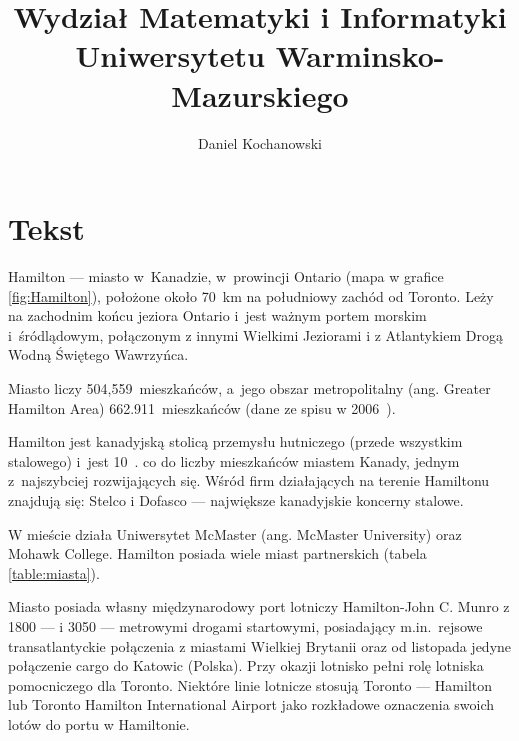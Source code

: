 \documentclass[a4paper,12pt]{article}
\title{Wydział Matematyki i Informatyki Uniwersytetu Warminsko-Mazurskiego}
\author{Daniel Kochanowski}
\begin{document}
\maketitle

\begin{abstract}
\end{abstract}

\section{Tekst}

\indent Hamilton --- miasto w~Kanadzie, w~prowincji Ontario (mapa w grafice \ref{fig:Hamilton}), położone około 70~km na południowy zachód od Toronto. Leży na zachodnim końcu jeziora Ontario i~jest ważnym portem morskim i~śródlądowym, połączonym z innymi Wielkimi Jeziorami i z Atlantykiem Drogą Wodną Świętego Wawrzyńca.

Miasto liczy 504,559~mieszkańców, a~jego obszar metropolitalny (ang. Greater Hamilton Area) 662.911~mieszkańców (dane ze spisu w 2006~).

Hamilton jest kanadyjską stolicą przemysłu hutniczego (przede wszystkim stalowego) i~jest 10~. co do liczby mieszkańców miastem Kanady, jednym z~najszybciej rozwijających się. Wśród firm działających na terenie Hamiltonu znajdują się: Stelco i Dofasco --- największe kanadyjskie koncerny stalowe.

W mieście działa Uniwersytet McMaster (ang. McMaster University) oraz Mohawk College. Hamilton posiada wiele miast partnerskich (tabela \ref{table:miasta}).

Miasto posiada własny międzynarodowy port lotniczy Hamilton-John C. Munro z 1800 --- i 3050 --- metrowymi drogami startowymi, posiadający m.in.~rejsowe transatlantyckie połączenia z miastami Wielkiej Brytanii oraz od listopada jedyne połączenie cargo do Katowic (Polska). Przy okazji lotnisko pełni rolę lotniska pomocniczego dla Toronto. Niektóre linie lotnicze stosują Toronto --- Hamilton lub Toronto Hamilton International Airport jako rozkładowe oznaczenia swoich lotów do portu w Hamiltonie.
\end{document}
